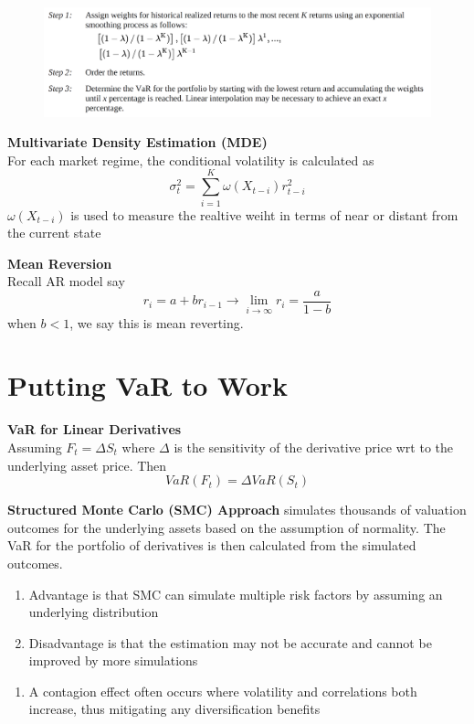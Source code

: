 \documentclass[11pt,fleqn]{report} %
\numberwithin{equation}{section} %
\numberwithin{figure}{section} %
\numberwithin{table}{section} %
\begin{document}
\begin{figure}[h!]
    \centering
    \includegraphics[scale=0.46]{hybrid.PNG}
\end{figure}
\begin{definition}\textbf{Multivariate Density Estimation (MDE)}\\
For each market regime, the conditional volatility is calculated as
$$
\sigma_t^2=\sum_{i=1}^K\omega(X_{t-i})r_{t-i}^2
$$
$\omega(X_{t-i})$ is used to measure the realtive weiht in terms of near or distant from the current state
\end{definition}
\begin{definition}\textbf{Mean Reversion}\\
Recall AR model say
$$
r_{i}=a+br_{i-1}\to \lim_{i\to\infty}r_i=\frac{a}{1-b}
$$
when $b<1$, we say this is mean reverting. 
\end{definition}
\chapter{Putting VaR to Work}
\begin{definition}\textbf{VaR for Linear Derivatives}\\
Assuming $F_t=\Delta S_t$ where $\Delta$ is the sensitivity of the derivative price wrt to the underlying asset price. Then
$$
VaR(F_t)=\Delta VaR(S_t)
$$
\end{definition}
\begin{definition}\textbf{Structured Monte Carlo (SMC) Approach} simulates thousands of valuation outcomes for the underlying assets based on the assumption of normality. The VaR for the portfolio of derivatives is then calculated from the simulated outcomes. 
\begin{enumerate}
    \item Advantage is that SMC can simulate multiple risk factors by assuming an underlying distribution
    \item Disadvantage is that the estimation may not be accurate and cannot be improved by more simulations
\end{enumerate}
\end{definition}
\begin{remark}
\begin{enumerate}
    \item A contagion effect often occurs where volatility and correlations both increase, thus mitigating any diversification benefits
\end{enumerate}
\end{remark}
\end{document}
